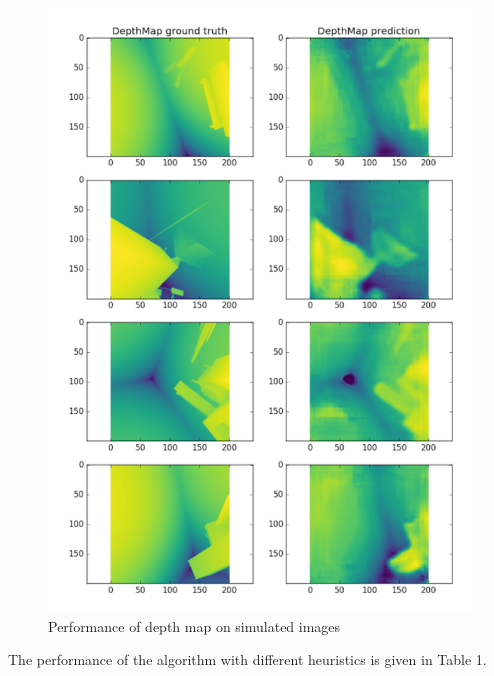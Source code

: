 \begin{figure}
  \includegraphics[width=\linewidth]{images/depthmap2.png}
  \caption{Performance of depth map on simulated images}
  \label{fig:depthmap2}
\end{figure}

The performance of the algorithm with different heuristics is given in Table 1.
 
